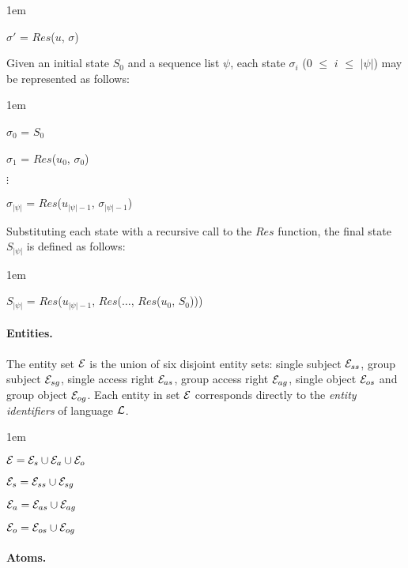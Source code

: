 \documentclass[global,twocolumn,final]{svjour}
\newenvironment{vquote}
  {\begin{list}{}{\leftmargin 1em}\item[]}
  {\end{list}}
\begin{document}
        \begin{vquote}
          $\sigma'$ = $Res$($u$, $\sigma$)
        \end{vquote}

        Given an initial state $S_{0}$ and a sequence list $\psi$, each state
        $\sigma_{i}$ ($0$ $\leq$ $i$ $\leq$ $|\psi|$) may be represented as
        follows:

        \begin{vquote}
          $\sigma_{0}$ = $S_{0}$

          $\sigma_{1}$ = $Res$($u_{0}$, $\sigma_{0}$)

          $\vdots$

          $\sigma_{|\psi|}$ = $Res$($u_{|\psi| - 1}$, $\sigma_{|\psi| - 1}$)
        \end{vquote}

        Substituting each state with a recursive call to the $Res$ function,
        the final state $S_{|\psi|}$ is defined as follows:

        \begin{vquote}
          $S_{|\psi|}$ = $Res$($u_{|\psi| - 1}$, $Res$($\ldots$, $Res$($u_{0}$, $S_{0}$)))
        \end{vquote}

        \paragraph{Entities.}

          The entity set ${\cal E}$ is the union of six disjoint entity sets:
          single subject ${\cal E}_{ss}$, group subject ${\cal E}_{sg}$,
          single access right ${\cal E}_{as}$, group access right
          ${\cal E}_{ag}$, single object ${\cal E}_{os}$ and group object
          ${\cal E}_{og}$. Each entity in set ${\cal E}$ corresponds directly
          to the {\em entity identifiers} of language ${\cal L}$.

          \begin{vquote}
            ${\cal E} = {\cal E}_{s} \cup {\cal E}_{a} \cup {\cal E}_{o}$

            ${\cal E}_{s} = {\cal E}_{ss} \cup {\cal E}_{sg}$

            ${\cal E}_{a} = {\cal E}_{as} \cup {\cal E}_{ag}$

            ${\cal E}_{o} = {\cal E}_{os} \cup {\cal E}_{og}$
          \end{vquote}

        \paragraph{Atoms.}
\end{document}
